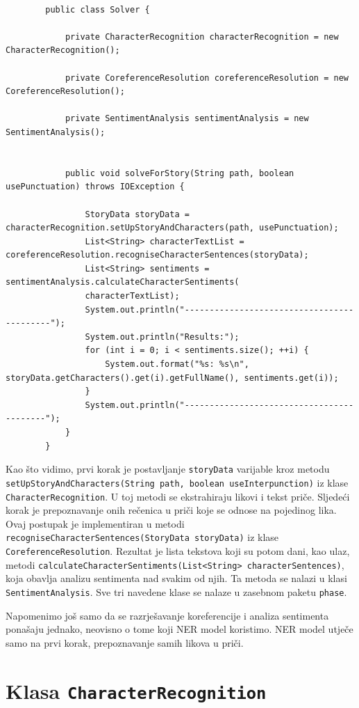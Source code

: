 \documentclass[a4paper,twoside,12pt]{memoir} %
\begin{document}
		\begin{lstlisting}

		public class Solver {

			private CharacterRecognition characterRecognition = new CharacterRecognition();

			private CoreferenceResolution coreferenceResolution = new CoreferenceResolution();

			private SentimentAnalysis sentimentAnalysis = new SentimentAnalysis();


			public void solveForStory(String path, boolean usePunctuation) throws IOException {

				StoryData storyData = characterRecognition.setUpStoryAndCharacters(path, usePunctuation);
				List<String> characterTextList = coreferenceResolution.recogniseCharacterSentences(storyData);
				List<String> sentiments = sentimentAnalysis.calculateCharacterSentiments(
				characterTextList);
				System.out.println("-------------------------------------------");
				System.out.println("Results:");
				for (int i = 0; i < sentiments.size(); ++i) {
					System.out.format("%s: %s\n", storyData.getCharacters().get(i).getFullName(), sentiments.get(i));
				}
				System.out.println("------------------------------------------");
			}
		}
		\end{lstlisting}

		Kao što vidimo, prvi korak je postavljanje \texttt{storyData} varijable kroz metodu \texttt{setUpStoryAndCharacters(String path, \!boolean useInterpunction)} iz klase \texttt{CharacterRecognition}. U toj metodi se ekstrahiraju likovi i tekst priče. Sljedeći korak je prepoznavanje onih rečenica u priči koje se odnose na pojedinog lika. Ovaj postupak je implementiran u metodi \texttt{recogniseCharacterSentences(StoryData storyData)} iz klase \texttt{CoreferenceResolution}. Rezultat je lista tekstova koji su potom dani, kao ulaz, metodi \texttt{calculateCharacterSentiments(List<String> characterSentences)}, koja obavlja analizu sentimenta nad svakim od njih. Ta metoda se nalazi u klasi \texttt{SentimentAnalysis}. Sve tri navedene klase se nalaze u zasebnom paketu \texttt{phase}.

		Napomenimo još samo da se razrješavanje koreferencije i analiza sentimenta ponašaju jednako, neovisno o tome koji NER model koristimo. NER model utječe samo na prvi korak, prepoznavanje samih likova u priči.

		\newpage

	\section{Klasa \texttt{CharacterRecognition}}
\end{document}
